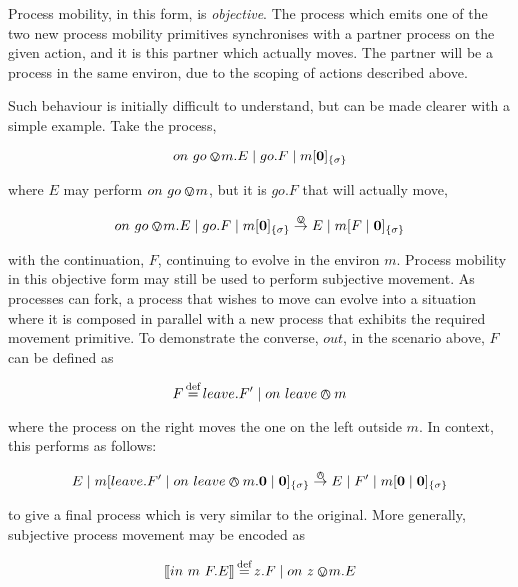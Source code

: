 \documentclass[orivec,envcountsame]{llncs}
\begin{document}
Process mobility, in this form, is \emph{objective}.  The process which
emits one of the two new process mobility primitives synchronises with a
partner process on the given action, and it is this partner which
actually moves.  The partner will be a process in the same environ, due
to the scoping of actions described above.

Such behaviour is initially difficult to understand, but can be made
clearer with a simple example.  Take the process,

\begin{equation}
on\ go \varovee\!m.E \mid go.F \mid {m}[ \textbf{0} ]_{\{\sigma\}}
\end{equation}

\noindent where $E$ may perform $on\ go \varovee\!m$, but it
is $go.F$ that will actually move,

\begin{equation}
on\ go \varovee\!m.E \mid go.F \mid {m}[ \textbf{0} ]_{\{\sigma\}} \stackrel{\varovee}{\rightarrow}
E \mid {m}[ F \mid \textbf{0} ]_{\{\sigma\}}
\end{equation}

\noindent with the continuation, $F$, continuing to evolve in the
environ $m$.  Process mobility in this objective form may still be used
to perform subjective movement.  As processes can fork, a process that
wishes to move can evolve into a situation where it is composed in
parallel with a new process that exhibits the required movement
primitive.  To demonstrate the converse, $out$, in the scenario
above, $F$ can be defined as

\begin{equation}
F \operatorname{\stackrel{\textrm{def}}{=}} leave.F^\prime \mid on\ leave \varowedge m
\end{equation}

\noindent where the process on the right moves the one on the left
outside $m$.  In context, this performs as follows:

\begin{equation}
E \mid {m}[ leave.F^\prime \mid on\ leave \varowedge m.\textbf{0} \mid
 \textbf{0} ]_{\{\sigma\}} 
\stackrel{\varowedge}{\rightarrow}
E \mid F^\prime \mid {m}[ \textbf{0} \mid \textbf{0} ]_{\{\sigma\}}
\end{equation}

\noindent to give a final process which is very similar to the original.
More generally, subjective process movement may be encoded as

\begin{equation}
[\hspace{-0.3ex}[ in\ m\ F.E ]\hspace{-0.3ex}] \operatorname{\stackrel{\textrm{def}}{=}} z.F \mid on\ z \varovee\!m.E
\end{equation}
\end{document}
